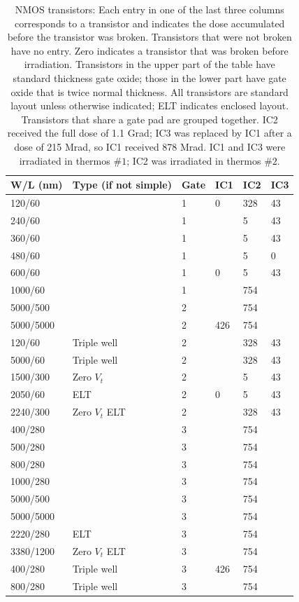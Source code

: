 \begin{table}
\begin{center}
\caption{NMOS transistors: Each entry in one of the last three columns corresponds to a transistor and indicates the dose accumulated before the transistor was broken.  Transistors that were not broken have no entry.  Zero indicates a transistor that was broken before irradiation.  Transistors in the upper part of the table have standard thickness gate oxide; those in the lower part have gate oxide that is twice normal thickness.  All transistors are standard layout unless otherwise indicated; ELT indicates enclosed layout.  Transistors that share a gate pad are grouped together.  IC2 received the full dose of 1.1 Grad; IC3 was replaced by IC1 after a dose of 215 Mrad, so IC1 received 878 Mrad.  IC1 and IC3 were irradiated in thermos $\#1$; IC2 was irradiated in thermos $\#2$.}
\begin{tabular}{| p{2cm} | p{3cm} | p{1cm} | p{2cm} | p{2cm} | p{2cm} |}
\hline
W/L (nm) & Type (if not simple) & Gate & IC1 & IC2 & IC3 \\ \hline
\hline
120/60 & & 1 & 0 & 328 & 43 \\ \hline
240/60 & & 1 & & 5 & 43 \\ \hline
360/60 & & 1 & & 5 & 43 \\ \hline
480/60 & & 1 & & 5 & 0 \\ \hline
600/60 & & 1 & 0 & 5 & 43 \\ \hline
1000/60 & & 1 & & 754 &  \\ \hline
5000/500 & & 2 & & 754 &  \\ \hline
5000/5000 & & 2 & 426 & 754 &  \\ \hline
120/60 & Triple well & 2 & & 328 &  43 \\ \hline
5000/60 & Triple well & 2 & & 328 &  43 \\ \hline
1500/300 & Zero $V_t$ & 2 & & 5 &  43 \\ \hline
2050/60 & ELT & 2 & 0 & 5 &  43 \\ \hline
2240/300 & Zero $V_t$ ELT & 2 & & 328 &  43 \\ \hline
\hline
400/280 & & 3 & & 754 &  \\ \hline
500/280 & & 3 & & 754 &  \\ \hline
800/280 & & 3 & & 754 &  \\ \hline
1000/280 & & 3 & & 754 &  \\ \hline
5000/500 & & 3 & & 754 &  \\ \hline
5000/5000 & & 3 & & 754 &  \\ \hline
2220/280 & ELT & 3 & & 754 &  \\ \hline
3380/1200 & Zero $V_t$ ELT & 3 & & 754 &  \\ \hline
400/280 & Triple well & 3 & 426 & 754 &  \\ \hline
800/280 & Triple well & 3 & & 754 &  \\ \hline
\end{tabular}
\label{tab:nmosbroken}
\end{center}
\end{table}

